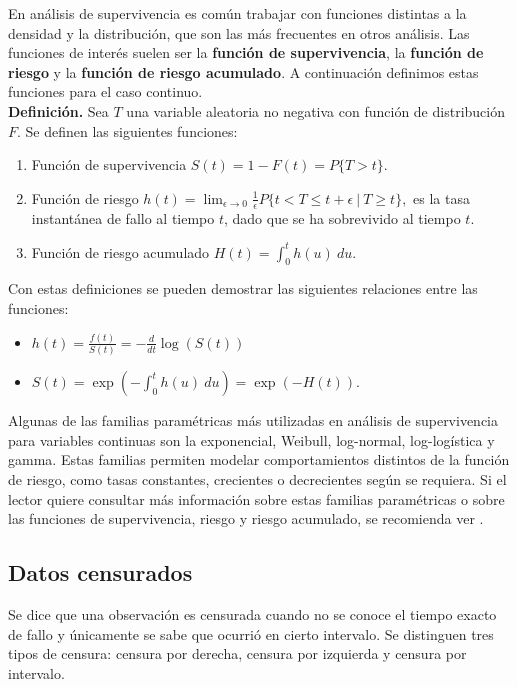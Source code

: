 \documentclass[11pt,a4paper]{article}
\begin{document}
En análisis de supervivencia es común trabajar con funciones distintas a la densidad y la distribución, que son las más frecuentes en otros análisis. Las funciones de interés suelen ser la \textbf{función de supervivencia}, la \textbf{función de riesgo} y la \textbf{función de riesgo acumulado}. A continuación definimos estas funciones para el caso continuo.\\

\textbf{Definición.} Sea $T$ una variable aleatoria no negativa con función de distribución $F$. Se definen las siguientes funciones:
\begin{enumerate}
\item Función de supervivencia $S(t) = 1-F(t) = P\lbrace T > t \rbrace$.
\item Función de riesgo $h(t) = \lim_{\epsilon \to 0} \frac{1}{\epsilon}P\lbrace t<T\leq t+\epsilon \ | \ T \geq t \rbrace,$  es la tasa instantánea de fallo al tiempo $t$, dado que se ha sobrevivido al tiempo $t$.
\item Función de riesgo acumulado $H(t) = \int_0^t h(u) \ du.$
\end{enumerate}
Con estas definiciones se pueden demostrar las siguientes relaciones entre las funciones:
\begin{itemize}
\item $h(t) = \frac{f(t)}{S(t)} = -\frac{d}{dt}\log(S(t))$
\item $S(t) = \exp \left(-\int_0^t h(u) \ du\right) = \exp(-H(t)).$\\
\end{itemize}

Algunas de las familias paramétricas más utilizadas en análisis de supervivencia para variables continuas son la exponencial, Weibull, log-normal, log-logística y gamma. Estas familias permiten modelar comportamientos distintos de la función de riesgo, como tasas constantes, crecientes o decrecientes según se requiera. Si el lector quiere consultar más información sobre estas familias paramétricas o sobre las funciones de supervivencia, riesgo y riesgo acumulado, se recomienda ver \citet{klein}.\\

\subsection{Datos censurados}

Se dice que una observación es censurada cuando no se conoce el tiempo exacto de fallo y únicamente se sabe que ocurrió en cierto intervalo. Se distinguen tres tipos de censura: censura por derecha, censura por izquierda y censura por intervalo.\\
\end{document}
